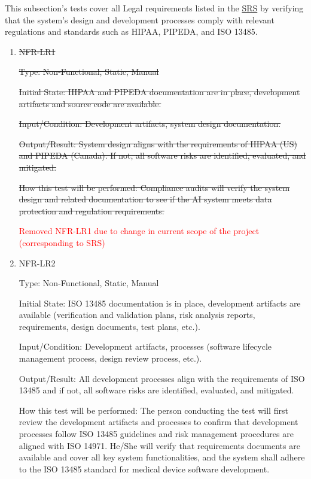 \documentclass[12pt, titlepage]{article}
\begin{document}
\begin{enumerate}
This subsection's tests cover all Legal requirements listed in the \href{https://github.com/RezaJodeiri/CXR-Capstone/blob/main/docs/SRS/SRS.pdf}{SRS} \citep{SRS}
 by verifying that the system's design and development processes comply with relevant regulations and standards such as HIPAA, PIPEDA, and ISO 13485.

\begin{enumerate}

\item{\sout{NFR-LR1}}\label{NFR-LR1}

\sout{Type: Non-Functional, Static, Manual}

\sout{Initial State: HIPAA and PIPEDA documentation are in place, development artifacts and source code are available.}

\sout{Input/Condition: Development artifacts, system design documentation.}

\sout{Output/Result: System design aligns with the requirements of HIPAA (US) and PIPEDA (Canada). If not, all software risks are identified, evaluated, and mitigated.}

\sout{How this test will be performed: Compliance audits will verify the system design and related documentation to see if the AI system meets data protection and regulation requirements.}


\textcolor{red}{Removed NFR-LR1 due to change in current scope of the project (corresponding to SRS)}

\item{NFR-LR2}\label{NFR-LR2}

Type: Non-Functional, Static, Manual

Initial State: ISO 13485 documentation is in place, development artifacts are available (verification and validation plans, risk analysis reports, requirements, design documents, test plans, etc.).

Input/Condition: Development artifacts, processes (software lifecycle management process, design review process, etc.).

Output/Result: All development processes align with the requirements of ISO 13485 and if not, all software risks are identified, evaluated, and mitigated.

How this test will be performed: The person conducting the test will first review the development artifacts and processes to confirm that development processes follow ISO 13485 guidelines and risk management procedures are aligned with ISO 14971. He/She will verify that requirements documents are available and cover all key system functionalities, and the system shall adhere to the ISO 13485 standard for medical device software development.


\end{enumerate}
\end{enumerate}
\end{document}
